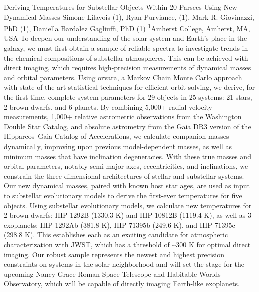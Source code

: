 \makeabstract
{
Deriving Temperatures for Substellar Objects Within 20 Parsecs Using New Dynamical Masses 
}
{
Simone Lilavois (1), Ryan Purviance, (1), Mark R. Giovinazzi, PhD (1), Daniella Bardalez Gagliuffi, PhD (1)
}
{
\textsuperscript{1}Amherst College, Amherst, MA, USA
}
{
To deepen our understanding of the solar system and Earth’s place in the galaxy, we must first obtain a sample of reliable spectra to investigate trends in the chemical compositions of substellar atmospheres. This can be achieved with direct imaging, which requires high-precision measurements of dynamical masses and orbital parameters. Using orvara, a Markov Chain Monte Carlo approach with state-of-the-art statistical techniques for efficient orbit solving, we derive, for the first time, complete system parameters for 29 objects in 25 systems: 21 stars, 2 brown dwarfs, and 6 planets.
}
{
By combining 5,000+ radial velocity measurements, 1,000+ relative astrometric observations from the Washington Double Star Catalog, and absolute astrometry from the Gaia DR3 version of the Hipparcos–Gaia Catalog of Accelerations, we calculate companion masses dynamically, improving upon previous model-dependent masses, as well as minimum masses that have inclination degeneracies. With these true masses and orbital parameters, notably semi-major axes, eccentricities, and inclinations, we constrain the three-dimensional architectures of stellar and substellar systems. Our new dynamical masses, paired with known host star ages, are used as input to substellar evolutionary models to derive the first-ever temperatures for five objects.
}
{
Using substellar evolutionary models, we calculate new temperatures for 2 brown dwarfs: HIP 1292B (1330.3 K) and HIP 10812B (1119.4 K), as well as 3 exoplanets: HIP 1292Ab (381.8 K), HIP 71395b (249.6 K), and HIP 71395c (298.8 K). This establishes each as an exciting candidate for atmospheric characterization with JWST, which has a threshold of \textasciitilde{}300 K for optimal direct imaging. 
}
{
Our robust sample represents the newest and highest precision constraints on systems in the solar neighborhood and will set the stage for the upcoming Nancy Grace Roman Space Telescope and Habitable Worlds Observatory, which will be capable of directly imaging Earth-like exoplanets.
}

\newpage
